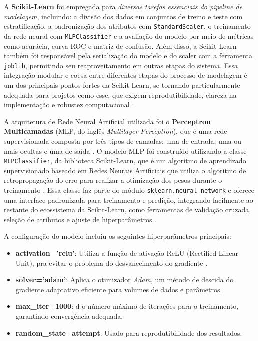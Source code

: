 A \textbf{Scikit-Learn} foi empregada para \textit{diversas tarefas essenciais do pipeline de modelagem}, incluindo: a divisão dos dados em conjuntos de treino e teste com estratificação, a padronização dos atributos com \texttt{StandardScaler}, o treinamento da rede neural com \texttt{MLPClassifier} e a avaliação do modelo por meio de métricas como acurácia, curva ROC e matriz de confusão. Além disso, a Scikit-Learn também foi responsável pela serialização do modelo e do scaler com a ferramenta \texttt{joblib}, permitindo seu reaproveitamento em outras etapas do sistema. Essa integração modular e coesa entre diferentes etapas do processo de modelagem é um dos principais pontos fortes da Scikit-Learn, se tornando particularmente adequada para projetos como esse, que exigem reprodutibilidade, clareza na implementação e robustez computacional \cite{geron2017}.

A arquitetura de Rede Neural Artificial utilizada foi o \textbf{Perceptron Multicamadas} (MLP, do inglês \textit{Multilayer Perceptron}), que é uma rede supervisionada composta por três tipos de camadas: uma de entrada, uma ou mais ocultas e uma de saída \cite{haykin2009}. O modelo MLP foi construído utilizando a classe \texttt{MLPClassifier}, da biblioteca Scikit-Learn, que é um algoritmo de aprendizado supervisionado baseado em Redes Neurais Artificiais que utiliza o algoritmo de retropropagação do erro para realizar a otimização dos pesos durante o treinamento \cite{geron2017}.  Essa classe faz parte do módulo \texttt{sklearn.neural\_network} e oferece uma interface padronizada para treinamento e predição, integrando facilmente ao restante do ecossistema da Scikit-Learn, como ferramentas de validação cruzada, seleção de atributos e ajuste de hiperparâmetros \cite{geron2017}. 

A configuração do modelo incluiu os seguintes hiperparâmetros principais:
\begin{itemize}
  \item \textbf{activation='relu'}: Utiliza a função de ativação ReLU (Rectified Linear Unit), pra evitar o problema do desvanecimento do gradiente \cite{geron2017}.
  \item \textbf{solver='adam'}: Aplica o otimizador \textit{Adam}, um método de descida do gradiente adaptativo eficiente para volumes de dados e parâmetros.
  \item \textbf{max\_iter=1000}: d o número máximo de iterações para o treinamento, garantindo convergência adequada.
  \item \textbf{random\_state=attempt}: Usado para reprodutibilidade dos resultados.
\end{itemize}

